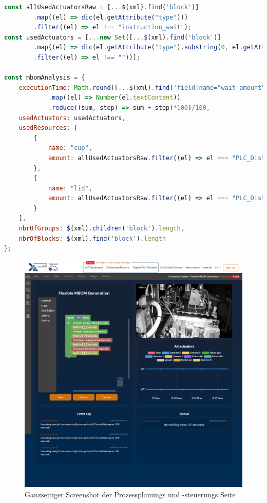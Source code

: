 \begin{lstlisting}[language=JavaScript,caption={Code zur Erstellung des Prozess-Randdaten-Objektes},captionpos=b,label={lst:anhang_code_analyse}]
const allUsedActuatorsRaw = [...$(xml).find('block')]
		.map((el) => dic(el.getAttribute("type")))
		.filter((el) => el !== "instruction_wait");
const usedActuators = [...new Set([...$(xml).find('block')]
		.map((el) => dic(el.getAttribute("type").substring(0, el.getAttribute("type").indexOf("__"))))
		.filter((el) => el !== ""))];

const mbomAnalysis = {
    executionTime: Math.round([...$(xml).find('field[name="wait_amount"]')]
    		.map((el) => Number(el.textContent))
    		.reduce((sum, step) => sum + step)*100)/100,
	usedActuators: usedActuators,
	usedResources: [
		{
			name: "cup",
			amount: allUsedActuatorsRaw.filter((el) => el === "PLC_Distribute_ExtendSlide__ON").length
		},
		{
			name: "lid",
			amount: allUsedActuatorsRaw.filter((el) => el === "PLC_Distribute_Vacuum__ON").length
		}
	],
	nbrOfGroups: $(xml).children('block').length,
	nbrOfBlocks: $(xml).find('block').length
};
\end{lstlisting}
%
\begin{figure}[htbp]
	\centering\includegraphics[width=1.0\textwidth]{images/anhang/Screenshot_Prozessplanung.png}
    \caption{Ganzseitiger Screenshot der Prozessplanungs und -steuerungs Seite}
    \label{fig:anhang_Screenshot_Prozessplanung}
\end{figure}
